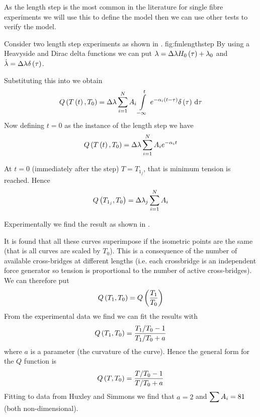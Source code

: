 As the length step is the most common in the literature for single fibre
experiments we will use this to define the model then we can use other tests to
verify the model. 

Consider two length step experiments as shown in .
{fig:fmlengthstep}{}
By using a Heavyside and Dirac delta functions we can put
$\lambda=\Delta\lambda  H_{0}\left( \tau \right) +\lambda_{0}$ and
$\dot{\lambda}=\Delta\lambda \delta\left( \tau \right) $. 

Substituting this into
 we obtain
\begin{equation*}
  \fnof{Q}{\fnof{T}{t},T_{0}}=\Delta\lambda\dsum_{i=1}^{N}A_{i}\gint{-\infty}{t}
  {e^{-\alpha_{i}\pbrac{t-\tau}}\fnof{\delta}{\tau}}{\tau}
\end{equation*}
Now defining $t=0$ as the instance of the length step we have
\begin{equation*}
   Q\left(  T\left( t \right) ,T_{0} \right) =\Delta\lambda \displaystyle\sum _{i=1}^{N}A_{i}e^{-\alpha_{i}t}
\end{equation*}

At $t=0$ (immediately after the step) $T=T_{1_{j}}$, that is minimum tension
is reached. Hence
\begin{equation}
   Q\left( T_{1_{j}},T_{0} \right) =\Delta\lambda_{j} \displaystyle\sum _{i=1}^{N}A_{i}
\end{equation}

Experimentally we find the result as shown in .


It is found that all these curves superimpose if the isometric points are 
the same (that is all curves are scaled by $T_{0}$). This is a consequence of
the number of available cross-bridges at different lengths (i.e. each
crossbridge is an independent force generator so tension is proportional to
the number of active cross-bridges). We can therefore put
\begin{equation*}
   Q\left( T_{1},T_{0} \right) = Q\left( \dfrac{T_{1}}{T_{0}} \right) 
\end{equation*}
From the experimental data we find we can fit the results with
\begin{equation*}
   Q\left( T_{1},T_{0} \right) =\dfrac{T_{1}/T_{0}-1}{T_{1}/T_{0}+a}
\end{equation*}
where $a$ is a parameter (the curvature of the curve). Hence the general form
for the $Q$ function is
\begin{equation}
   Q\left( T,T_{0} \right) =\dfrac{T/T_{0}-1}{T/T_{0}+a}  
  \label{eqn:Qdefinition}
\end{equation}
Fitting to data from Huxley and Simmons we find that $a=2$ and $ \displaystyle\sum 
A_{i}=81$ (both non-dimensional). 


